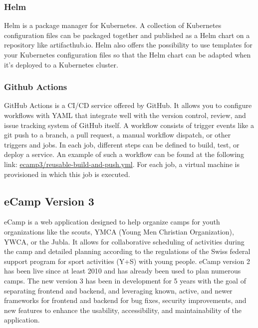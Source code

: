 \documentclass[conference]{IEEEtran}
\begin{document}
\subsubsection{Helm}

Helm is a package manager for Kubernetes\cite{helm-website}.
A collection of Kubernetes configuration files can be packaged together and published as a Helm chart on a repository
like artifacthub.io\cite{artifacthub-io}.
Helm also offers the possibility to use templates for your Kubernetes configuration files so that the Helm chart
can be adapted when it's deployed to a Kubernetes cluster.

\subsubsection{Github Actions}

GitHub Actions is a CI/CD service offered by GitHub\cite{github-actions-website}.
It allows you to configure workflows with YAML that integrate well with the version control, review,
and issue tracking system of GitHub itself.
A workflow consists of trigger events like a git push to a branch, a pull request, a manual workflow dispatch, or
other triggers and jobs.
In each job, different steps can be defined to build, test, or deploy a service.
An example of such a workflow can be found at the following link: \href{https://github.com/ecamp/ecamp3/blob/7a1cf92e3eee27b0b942fcd87bd8ce5c221089b7/.github/workflows/reusable-build-and-push.yml}{ecamp3/reusable-build-and-push.yml}.
For each job, a virtual machine is provisioned in which this job is executed\cite{github-actions-about-runner}.

\subsection{eCamp Version 3}

eCamp is a web application designed to help organize camps for youth organizations like the
scouts, YMCA (Young Men Christian Organization)\cite{ymca-website}, YWCA, or the Jubla.
It allows for collaborative scheduling of activities during the camp and detailed planning
according to the regulations of the Swiss federal support program for sport activities (Y+S) with young people\cite{J+S-Website,ecamp3-website}.
eCamp version 2 has been live since at least 2010\cite{ecamp2-first-commit} and has already been used to plan numerous camps.
The new version 3 has been in development for 5 years\cite{ecamp3-website} with the goal of separating frontend and backend,
and leveraging known, active, and newer frameworks for frontend and backend for bug fixes, security improvements,
and new features to enhance the usability, accessibility, and maintainability of the application.
\end{document}
